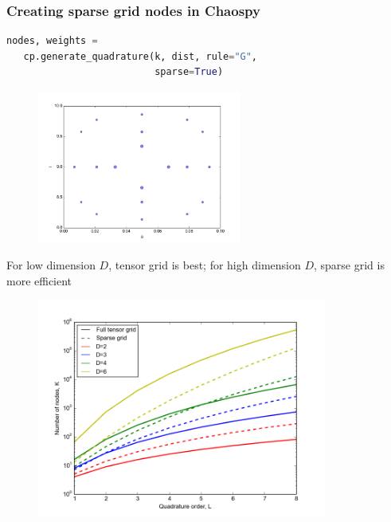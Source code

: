 \documentclass{beamer}
\begin{document}
\begin{frame}[fragile]
 \frametitle{Creating sparse grid nodes in Chaospy}
 \begin{lstlisting}[language=python]
  nodes, weights =
   cp.generate_quadrature(k, dist, rule="G",
                          sparse=True)
 \end{lstlisting}

 \pause
 \begin{figure}
  \includegraphics[width=0.6\textwidth]{nodes_sparse.png}
 \end{figure}
\end{frame}

\begin{frame}{For low dimension $D$, tensor grid is best; for high dimension $D$, sparse grid is more efficient}{}
     \begin{figure}
  \includegraphics[width=0.85\textwidth]{dimensionality_nodes_gq_sparse.png}
 \end{figure}
\end{frame}

\end{document}
